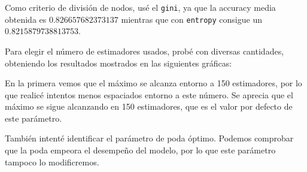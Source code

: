 \documentclass[a4]{article}
\begin{document}
Como criterio de división de nodos, usé el \texttt{gini}, ya que la accuracy media obtenida es $0.826657682373137$ mientras que con \texttt{entropy} consigue un $0.8215879738813753$.

Para elegir el número de estimadores usados, probé con diversas cantidades, obteniendo los resultados mostrados en las siguientes gráficas:

\begin{figure}[H]
  \centering
\end{figure}

En la primera vemos que el máximo se alcanza entorno a 150 estimadores, por lo que realicé intentos menos espaciados entorno a este número. Se aprecia que el máximo se sigue alcanzando en 150 estimadores, que es el valor por defecto de este parámetro.

También intenté identificar el parámetro de poda óptimo. Podemos comprobar que la poda empeora el desempeño del modelo, por lo que este parámetro tampoco lo modificremos.

\begin{figure}[H]
  \centering
\end{figure}
\end{document}
